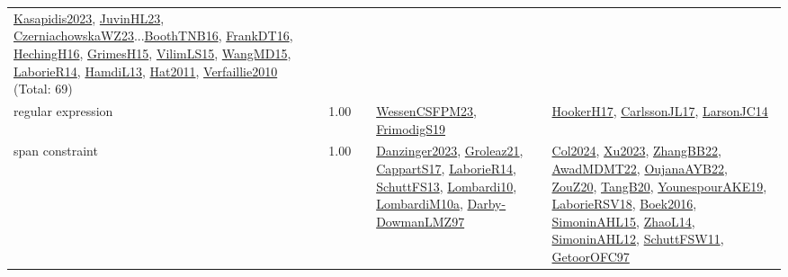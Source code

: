 {\begin{longtable}{p{3cm}r>{\raggedright\arraybackslash}p{6cm}>{\raggedright\arraybackslash}p{6cm}>{\raggedright\arraybackslash}p{8cm}}
\hyperref[detail:Kasapidis2023]{Kasapidis2023}, \hyperref[detail:JuvinHL23]{JuvinHL23}, \hyperref[detail:CzerniachowskaWZ23]{CzerniachowskaWZ23}...\hyperref[detail:BoothTNB16]{BoothTNB16}, \hyperref[detail:FrankDT16]{FrankDT16}, \hyperref[detail:HechingH16]{HechingH16}, \hyperref[detail:GrimesH15]{GrimesH15}, \hyperref[detail:VilimLS15]{VilimLS15}, \hyperref[detail:WangMD15]{WangMD15}, \hyperref[detail:LaborieR14]{LaborieR14}, \hyperref[detail:HamdiL13]{HamdiL13}, \hyperref[detail:Hat2011]{Hat2011}, \hyperref[detail:Verfaillie2010]{Verfaillie2010} (Total: 69)\\
\index{regular expression}\index{Constraints!regular expression}regular expression &  1.00 &  & \hyperref[detail:WessenCSFPM23]{WessenCSFPM23}, \hyperref[detail:FrimodigS19]{FrimodigS19} & \hyperref[detail:HookerH17]{HookerH17}, \hyperref[detail:CarlssonJL17]{CarlssonJL17}, \hyperref[detail:LarsonJC14]{LarsonJC14}\\
\index{span constraint}\index{Constraints!span constraint}span constraint &  1.00 &  & \hyperref[detail:Danzinger2023]{Danzinger2023}, \hyperref[detail:Groleaz21]{Groleaz21}, \hyperref[detail:CappartS17]{CappartS17}, \hyperref[detail:LaborieR14]{LaborieR14}, \hyperref[detail:SchuttFS13]{SchuttFS13}, \hyperref[detail:Lombardi10]{Lombardi10}, \hyperref[detail:LombardiM10a]{LombardiM10a}, \hyperref[detail:Darby-DowmanLMZ97]{Darby-DowmanLMZ97} & \hyperref[detail:Col2024]{Col2024}, \hyperref[detail:Xu2023]{Xu2023}, \hyperref[detail:ZhangBB22]{ZhangBB22}, \hyperref[detail:AwadMDMT22]{AwadMDMT22}, \hyperref[detail:OujanaAYB22]{OujanaAYB22}, \hyperref[detail:ZouZ20]{ZouZ20}, \hyperref[detail:TangB20]{TangB20}, \hyperref[detail:YounespourAKE19]{YounespourAKE19}, \hyperref[detail:LaborieRSV18]{LaborieRSV18}, \hyperref[detail:Boek2016]{Boek2016}, \hyperref[detail:SimoninAHL15]{SimoninAHL15}, \hyperref[detail:ZhaoL14]{ZhaoL14}, \hyperref[detail:SimoninAHL12]{SimoninAHL12}, \hyperref[detail:SchuttFSW11]{SchuttFSW11}, \hyperref[detail:GetoorOFC97]{GetoorOFC97}\\

\end{longtable}}
